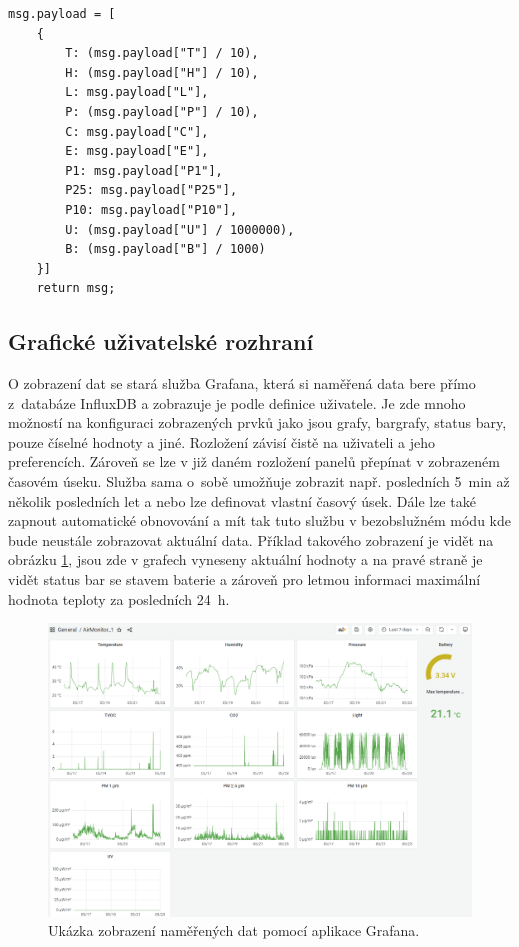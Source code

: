\noindent
\begin{minipage}{\linewidth}
\begin{lstlisting}[caption={Funkce pro převod naměřených dat do desetinné podoby.}, label={code_intToFloat}]
    msg.payload = [
    {
        T: (msg.payload["T"] / 10),
        H: (msg.payload["H"] / 10),
        L: msg.payload["L"],
        P: (msg.payload["P"] / 10),
        C: msg.payload["C"],
        E: msg.payload["E"],
        P1: msg.payload["P1"],
        P25: msg.payload["P25"],
        P10: msg.payload["P10"],
        U: (msg.payload["U"] / 1000000),
        B: (msg.payload["B"] / 1000)
    }]
    return msg;
\end{lstlisting}
\end{minipage}

\subsection{Grafické uživatelské rozhraní}

O zobrazení dat se stará služba Grafana, která si naměřená data bere přímo z~databáze InfluxDB a zobrazuje je podle definice uživatele. Je zde mnoho možností na konfiguraci zobrazených prvků jako jsou grafy, bargrafy, status bary, pouze číselné hodnoty a jiné. Rozložení závisí čistě na uživateli a jeho preferencích. Zároveň se lze v již daném rozložení panelů přepínat v zobrazeném časovém úseku. Služba sama o~sobě umožňuje zobrazit např. posledních \SI{5}{\minute} až několik posledních let a nebo lze definovat vlastní časový úsek. Dále lze také zapnout automatické obnovování a mít tak tuto službu v bezobslužném módu kde bude neustále zobrazovat aktuální data. Příklad takového zobrazení je vidět na obrázku \ref{fig_Grafana}, jsou zde v grafech vyneseny aktuální hodnoty a na pravé straně je vidět status bar se stavem baterie a zároveň pro letmou informaci maximální hodnota teploty za posledních \SI{24}{\hour}.

\begin{figure}[h]
    \centering
    \includegraphics[width=\textwidth]{obrazky/grafana.png}
    \caption{Ukázka zobrazení naměřených dat pomocí aplikace Grafana.}
    \label{fig_Grafana}
\end{figure}